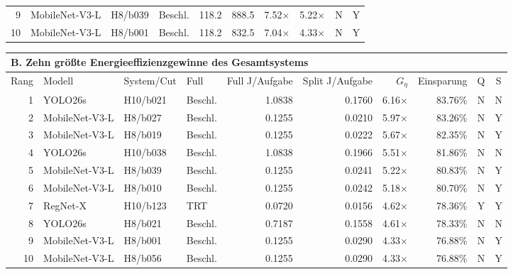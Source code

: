 \begin{table}[t]
\begin{tabular*}{\textwidth}{@{\extracolsep{\fill}}rlllrrrrcc@{}}
9 & MobileNet-V3-L & H8/b039 & Beschl. & 118.2 & 888.5 & 7.52$\times$ & 5.22$\times$ & N & Y\\
10 & MobileNet-V3-L & H8/b001 & Beschl. & 118.2 & 832.5 & 7.04$\times$ & 4.33$\times$ & N & Y\\
\bottomrule
\end{tabular*}
\par\vspace{0.6em}
\begin{tabular*}{\textwidth}{@{\extracolsep{\fill}}rlllrrrrcc@{}}
\toprule
\multicolumn{10}{l}{\textbf{B. Zehn größte Energieeffizienzgewinne des Gesamtsystems}}\\
\midrule
Rang & Modell & System/Cut & Full & Full J/Aufgabe & Split J/Aufgabe & $G_\eta$ & Einsparung & Q & S\\
\midrule
1 & YOLO26s & H10/b021 & Beschl. & 1.0838 & 0.1760 & 6.16$\times$ & 83.76\% & N & N\\
2 & MobileNet-V3-L & H8/b027 & Beschl. & 0.1255 & 0.0210 & 5.97$\times$ & 83.26\% & N & Y\\
3 & MobileNet-V3-L & H8/b019 & Beschl. & 0.1255 & 0.0222 & 5.67$\times$ & 82.35\% & N & Y\\
4 & YOLO26s & H10/b038 & Beschl. & 1.0838 & 0.1966 & 5.51$\times$ & 81.86\% & N & N\\
5 & MobileNet-V3-L & H8/b039 & Beschl. & 0.1255 & 0.0241 & 5.22$\times$ & 80.83\% & N & Y\\
6 & MobileNet-V3-L & H8/b010 & Beschl. & 0.1255 & 0.0242 & 5.18$\times$ & 80.70\% & N & Y\\
7 & RegNet-X & H10/b123 & TRT & 0.0720 & 0.0156 & 4.62$\times$ & 78.36\% & Y & Y\\
8 & YOLO26s & H8/b021 & Beschl. & 0.7187 & 0.1558 & 4.61$\times$ & 78.33\% & N & N\\
9 & MobileNet-V3-L & H8/b001 & Beschl. & 0.1255 & 0.0290 & 4.33$\times$ & 76.88\% & N & Y\\
10 & MobileNet-V3-L & H8/b056 & Beschl. & 0.1255 & 0.0290 & 4.33$\times$ & 76.88\% & N & Y\\
\bottomrule
\end{tabular*}
\endgroup
\end{table}
